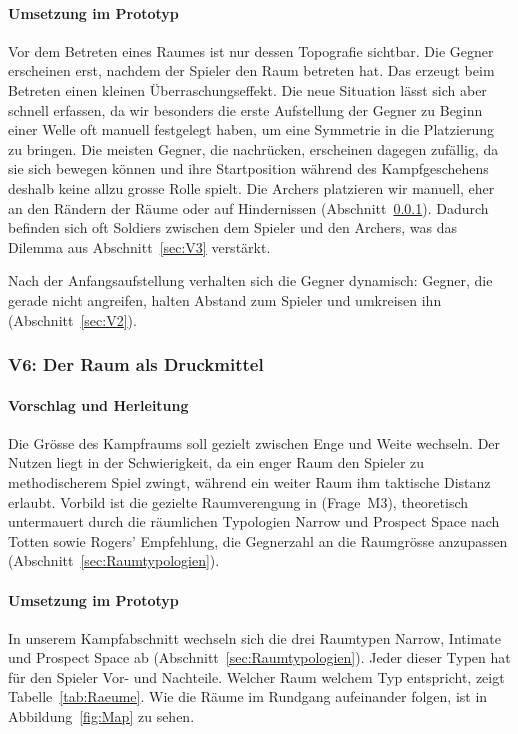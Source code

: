 \documentclass[../Main.tex]{subfiles}
\begin{document}
\paragraph{Umsetzung im Prototyp}
Vor dem Betreten eines Raumes ist nur dessen Topografie sichtbar. Die Gegner erscheinen erst, nachdem der Spieler den Raum betreten hat. Das erzeugt beim Betreten einen kleinen Überraschungseffekt. Die neue Situation lässt sich aber schnell erfassen, da wir besonders die erste Aufstellung der Gegner zu Beginn einer Welle oft manuell festgelegt haben, um eine Symmetrie in die Platzierung zu bringen. Die meisten Gegner, die nachrücken, erscheinen dagegen zufällig, da sie sich bewegen können und ihre Startposition während des Kampfgeschehens deshalb keine allzu grosse Rolle spielt. Die Archers platzieren wir manuell, eher an den Rändern der Räume oder auf Hindernissen (Abschnitt~\ref{sec:V6}). Dadurch befinden sich oft Soldiers zwischen dem Spieler und den Archers, was das Dilemma aus Abschnitt~\ref{sec:V3} verstärkt.

Nach der Anfangsaufstellung verhalten sich die Gegner dynamisch: Gegner, die gerade nicht angreifen, halten Abstand zum Spieler und umkreisen ihn (Abschnitt~\ref{sec:V2}).

\subsubsection{V6: Der Raum als Druckmittel} \label{sec:V6}

\paragraph{Vorschlag und Herleitung}
Die Grösse des Kampfraums soll gezielt zwischen Enge und Weite wechseln. Der Nutzen liegt in der Schwierigkeit, da ein enger Raum den Spieler zu methodischerem Spiel zwingt, während ein weiter Raum ihm taktische Distanz erlaubt. Vorbild ist die gezielte Raumverengung in  (Frage~M3), theoretisch untermauert durch die räumlichen Typologien Narrow und Prospect Space nach Totten sowie Rogers' Empfehlung, die Gegnerzahl an die Raumgrösse anzupassen (Abschnitt~\ref{sec:Raumtypologien}).

\paragraph{Umsetzung im Prototyp}
In unserem Kampfabschnitt wechseln sich die drei Raumtypen Narrow, Intimate und Prospect Space ab (Abschnitt~\ref{sec:Raumtypologien}). Jeder dieser Typen hat für den Spieler Vor- und Nachteile. Welcher Raum welchem Typ entspricht, zeigt Tabelle~\ref{tab:Raeume}. Wie die Räume im Rundgang aufeinander folgen, ist in Abbildung~\ref{fig:Map} zu sehen.
\end{document}
